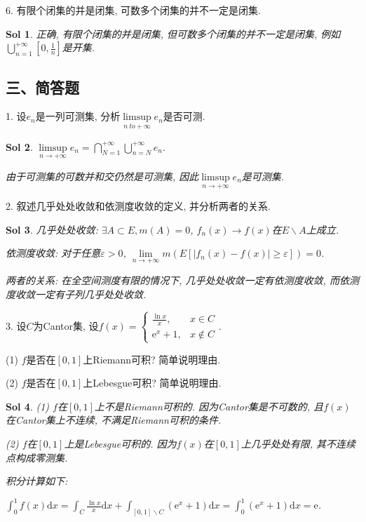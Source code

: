 \documentclass[UTF8]{article}
\newtheorem{solution}{Sol}
\begin{document}
  6. 有限个闭集的并是闭集, 可数多个闭集的并不一定是闭集.\par

  \begin{solution}
    正确, 有限个闭集的并是闭集, 但可数多个闭集的并不一定是闭集, 例如$\bigcup_{n=1}^{+\infty}[0,\frac{1}{n}]$是开集.\par
  \end{solution}

  \subsection*{三、简答题}

  1. 设$e_n$是一列可测集, 分析$\limsup \limits_{n \ to +\infty}e_n$是否可测.\par

  \begin{solution}
    $\limsup \limits_{n \to +\infty}e_n = \bigcap_{N=1}^{+\infty}\bigcup_{n=N}^{+\infty}e_n$.\par
    由于可测集的可数并和交仍然是可测集, 因此$\limsup \limits_{n \to +\infty}e_n$是可测集.\par
  \end{solution}

  2. 叙述几乎处处收敛和依测度收敛的定义, 并分析两者的关系.\par

  \begin{solution}
    几乎处处收敛: $\exists A\subset E, m(A)=0$, $f_n(x) \to f(x)$在$E\backslash A$上成立.\par
    依测度收敛: 对于任意$\varepsilon >0$, $\lim \limits_{n \to +\infty}m(E\left[|f_n(x)-f(x)|\geqslant \varepsilon\right])=0$.\par
    两者的关系: 在全空间测度有限的情况下, 几乎处处收敛一定有依测度收敛, 而依测度收敛一定有子列几乎处处收敛.\par
  \end{solution}

  3. 设$C$为Cantor集, 设$f(x)=\begin{cases}
    \frac{\ln x}{x}, & x\in C \\
    \mathrm{e}^x+1, & x\notin C
  \end{cases}$.\par
  (1) $f$是否在$[0,1]$上Riemann可积? 简单说明理由.\par
  (2) $f$是否在$[0,1]$上Lebesgue可积? 简单说明理由.\par

  \begin{solution}
    (1) $f$在$[0,1]$上不是Riemann可积的. 因为Cantor集是不可数的, 且$f(x)$在Cantor集上不连续, 不满足Riemann可积的条件.\par
    (2) $f$在$[0,1]$上是Lebesgue可积的. 因为$f(x)$在$[0,1]$上几乎处处有限, 其不连续点构成零测集.\par
    积分计算如下:\par
    $\int_{0}^{1}f(x)\mathrm{d}x=\int_{C}\frac{\ln x}{x}\mathrm{d}x+\int_{[0,1]\backslash C}(\mathrm{e}^x+1)\mathrm{d}x=\int_{0}^{1}(\mathrm{e}^x+1)\mathrm{d}x = \mathrm{e}$.\par
  \end{solution}
\end{document}
